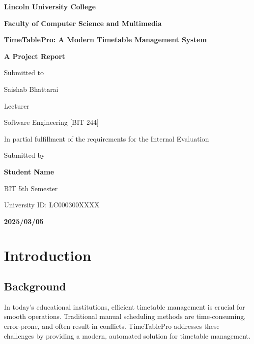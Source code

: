 \documentclass[12pt,a4paper]{report}
\begin{document}
\begin{titlepage}
    \centering
    {\LARGE \textbf{Lincoln University College}\par}
    \vspace{0.2cm}
    {\Large \textbf{Faculty of Computer Science and Multimedia}\par}
    \vspace{0.5cm}
    {\LARGE \textbf{TimeTablePro: A Modern Timetable Management System}\par}
    \vspace{0.5cm}
    {\Large \textbf{A Project Report}\par}
    \vspace{0.3cm}
    {\large Submitted to\par}
    \vspace{0.3cm}
    {\Large Saishab Bhattarai\par}
    {\Large Lecturer\par}
    {\Large Software Engineering [BIT 244]\par}
    \vspace{0.3cm}
    {\large In partial fulfillment of the requirements for the Internal Evaluation \par}
    \vspace{0.3cm}
    {\large Submitted by\par}
    \vspace{0.2cm}
    {\Large \textbf{Student Name}\par}
    {\Large BIT 5th Semester\par}
    {\Large University ID: LC000300XXXX\par}
    \vspace{0.5cm}
    {\large \textbf{2025/03/05}\par}
\end{titlepage}
\clearpage

\tableofcontents
\clearpage

\chapter{Introduction}
\section{Background}
In today's educational institutions, efficient timetable management is crucial for smooth operations. Traditional manual scheduling methods are time-consuming, error-prone, and often result in conflicts. TimeTablePro addresses these challenges by providing a modern, automated solution for timetable management.
\end{document}
